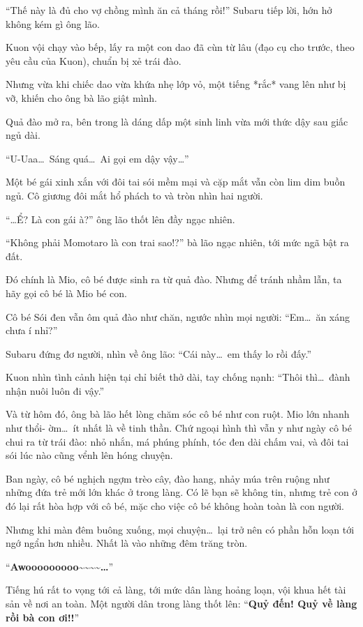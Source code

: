 \documentclass[../main.tex]{subfiles}
\begin{document}
``Thế này là đủ cho vợ chồng mình ăn cả tháng rồi!'' Subaru tiếp lời, hớn hở không kém gì ông lão.

Kuon vội chạy vào bếp, lấy ra một con dao đã cùn từ lâu (đạo cụ cho trước, theo yêu cầu của Kuon), chuẩn bị xẻ trái đào.

Nhưng vừa khi chiếc dao vừa khứa nhẹ lớp vỏ, một tiếng *rắc* vang lên như bị vỡ, khiến cho ông bà lão giật mình.

Quả đào mở ra, bên trong là dáng dấp một sinh linh vừa mới thức dậy sau giấc ngủ dài.

``U-Uaa\dots\ Sáng quá\dots\ Ai gọi em dậy vậy\dots''

Một bé gái xinh xắn với đôi tai sói mềm mại và cặp mắt vẫn còn lim dim buồn ngủ. Cô giương đôi mắt hổ phách to và tròn nhìn hai người.

``\dots Ể? Là con gái à?'' ông lão thốt lên đầy ngạc nhiên.

``Không phải Momotaro là con trai sao!?'' bà lão ngạc nhiên, tới mức ngã bật ra đất.

Đó chính là Mio, cô bé được sinh ra từ quả đào. Nhưng để tránh nhầm lẫn, ta hãy gọi cô bé là Mio bé con.

Cô bé Sói đen vẫn ôm quả đào như chăn, ngước nhìn mọi người: ``Em\dots\ ăn xáng chưa í nhỉ?''

Subaru đứng đơ người, nhìn về ông lão: ``Cái này\dots\ em thấy lo rồi đấy.''

Kuon nhìn tình cảnh hiện tại chỉ biết thở dài, tay chống nạnh: ``Thôi thì\dots\ đành nhận nuôi luôn đi vậy.''

Và từ hôm đó, ông bà lão hết lòng chăm sóc cô bé như con ruột. Mio lớn nhanh như thổi- ờm\dots\ ít nhất là về tinh thần. Chứ ngoại hình thì vẫn y như ngày cô bé chui ra từ trái đào: nhỏ nhắn, má phúng phính, tóc đen dài chấm vai, và đôi tai sói lúc nào cũng vểnh lên hóng chuyện.

Ban ngày, cô bé nghịch ngợm trèo cây, đào hang, nhảy múa trên ruộng như những đứa trẻ mới lớn khác ở trong làng. Có lẽ bạn sẽ không tin, nhưng trẻ con ở đó lại rất hòa hợp với cô bé, mặc cho việc cô bé không hoàn toàn là con người.

Nhưng khi màn đêm buông xuống, mọi chuyện\dots\ lại trở nên có phần hỗn loạn tới ngớ ngẩn hơn nhiều. Nhất là vào những đêm trăng tròn.

``\textbf{Awooooooooo\~{}\~{}\~{}\~{}\dots}''

Tiếng hú rất to vọng tới cả làng, tới mức dân làng hoảng loạn, vội khua hết tài sản về nơi an toàn. Một người dân trong làng thốt lên: ``\textbf{Quỷ đến! Quỷ về làng rồi bà con ơi!!}''
\end{document}

